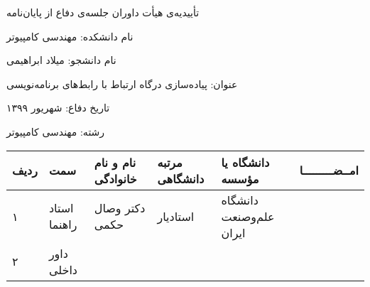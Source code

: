 \newpage
\thispagestyle{empty}

\begin{center}
{\Large
    تأییدیه‌ی هیأت داوران جلسه‌ی دفاع از پایان‌نامه
}
\end{center}
\vspace{1cm}

نام دانشكده: مهندسی کامپیوتر

نام دانشجو: میلاد ابراهیمی

عنوان: پیاده‌سازی درگاه ارتباط با رابط‌های برنامه‌نویسی

تاریخ دفاع: شهریور ۱۳۹۹

رشته: مهندسی کامپیوتر \\[50pt]
\begin{center}
    \begin{tabular}{| p{8mm} | p{18mm} | p{} |p{14mm}|p{}|c|}
        \hline
        ردیف & سمت & نام و نام خانوادگی & مرتبه دانشگاهی & دانشگاه یا مؤسسه & امــضـــــــــا\\
        \hline
        ۱ & استاد راهنما & دکتر \newline وصال حکمی & استادیار & دانشگاه علم‌و‌صنعت ایران &    \\
        \hline
        ۲ & داور داخلی &   &   &   &     \\
        \hline


    \end{tabular}
\end{center}


\cleardoublepage 